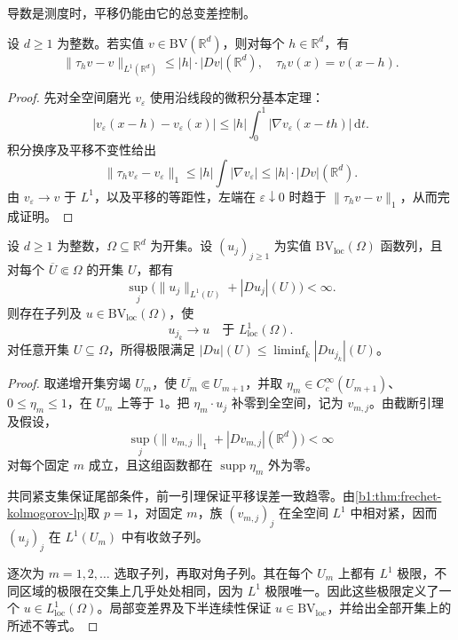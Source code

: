 导数是测度时，平移仍能由它的总变差控制。

\begin{lemma}\label{b1:lem:bv-translation-estimate}
设 \(d\ge1\) 为整数。若实值 \(v\in \mathrm{BV}(\mathbb R^d)\)，则对每个 \(h\in\mathbb R^d\)，有
\[
 \|\tau_hv-v\|_{L^1(\mathbb R^d)}
 \leq |h|\cdot|Dv|(\mathbb R^d),
 \quad \tau_hv(x)=v(x-h).
\]
\end{lemma}
\begin{proof}
先对全空间磨光 \(v_\varepsilon\) 使用沿线段的微积分基本定理：
\[
 |v_\varepsilon(x-h)-v_\varepsilon(x)|
 \leq|h|\int_0^1|\nabla v_\varepsilon(x-th)|\,\mathrm dt.
\]
积分换序及平移不变性给出
\[
 \|\tau_hv_\varepsilon-v_\varepsilon\|_1
 \leq|h|\int|\nabla v_\varepsilon|
 \leq|h|\cdot|Dv|(\mathbb R^d).
\]
由 \(v_\varepsilon\to v\) 于 \(L^1\)，以及平移的等距性，左端在
\(\varepsilon\downarrow0\) 时趋于 \(\|\tau_hv-v\|_1\)，从而完成证明。
\end{proof}

\begin{theorem}[有界变差函数的局部紧性]\label{b1:thm:bv-local-compactness}
设 \(d\ge1\) 为整数，\(\Omega\subseteq\mathbb R^d\) 为开集。设 \((u_j)_{j\ge1}\) 为实值 \(\mathrm{BV}_{\mathrm{loc}}(\Omega)\) 函数列，且对每个
\(\overline U\Subset\Omega\) 的开集 \(U\)，都有
\[
 \sup_j\bigl(\|u_j\|_{L^1(U)}+|Du_j|(U)\bigr)<\infty.
\]
则存在子列及 \(u\in \mathrm{BV}_{\mathrm{loc}}(\Omega)\)，使
\[
 u_{j_k}\longrightarrow u\quad\text{于 }L^1_{\mathrm{loc}}(\Omega).
\]
对任意开集 \(U\subseteq\Omega\)，所得极限满足
\(|Du|(U)\leq\liminf_k|Du_{j_k}|(U)\)。
\end{theorem}
\begin{proof}
取递增开集穷竭 \(U_m\)，使
\(\overline{U_m}\Subset U_{m+1}\)，并取
\(\eta_m\in C_c^\infty(U_{m+1})\)、\(0\leq\eta_m\leq1\)，在 \(U_m\) 上等于 \(1\)。把 \(\eta_m\cdot u_j\) 补零到全空间，记为 \(v_{m,j}\)。由截断引理及假设，
\[
 \sup_j\bigl(\|v_{m,j}\|_1+|Dv_{m,j}|(\mathbb R^d)\bigr)<\infty
\]
对每个固定 \(m\) 成立，且这组函数都在
\(\operatorname{supp}\eta_m\) 外为零。

共同紧支集保证尾部条件，前一引理保证平移误差一致趋零。由\cref{b1:thm:frechet-kolmogorov-lp}取 \(p=1\)，对固定 \(m\)，族
\((v_{m,j})_j\) 在全空间 \(L^1\) 中相对紧，因而 \((u_j)_j\) 在
\(L^1(U_m)\) 中有收敛子列。

逐次为 \(m=1,2,\ldots\) 选取子列，再取对角子列。其在每个 \(U_m\) 上都有 \(L^1\) 极限，不同区域的极限在交集上几乎处处相同，因为
\(L^1\) 极限唯一。因此这些极限定义了一个 \(u\in L^1_{\mathrm{loc}}(\Omega)\)。局部变差界及下半连续性保证 \(u\in \mathrm{BV}_{\mathrm{loc}}\)，并给出全部开集上的所述不等式。
\end{proof}

